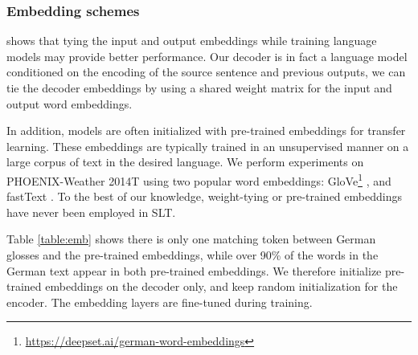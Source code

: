 \documentclass[11pt]{article}
\begin{document}
\subsubsection*{Embedding schemes}

 shows that tying the input and output embeddings while training language models may provide better performance. Our decoder is in fact a language model conditioned on the encoding of the source sentence and previous outputs, we can tie the decoder embeddings by using a shared weight matrix for the input and output word embeddings.  

In addition, models are often initialized with pre-trained embeddings for transfer learning. These embeddings are typically trained in an unsupervised manner on a large corpus of text in the desired language. We perform experiments on PHOENIX-Weather 2014T using two popular word embeddings: GloVe\footnote{\url{https://deepset.ai/german-word-embeddings}} \cite{glove}, and fastText \cite{fasttext}. To the best of our knowledge, weight-tying or pre-trained embeddings have never been employed in SLT.

\begin{center}
\label{table:emb}
\end{center}




Table \ref{table:emb} shows there is only one matching token between German glosses and the pre-trained embeddings, while over 90\% of the words in the German text appear in both pre-trained embeddings. We therefore initialize pre-trained embeddings on the decoder only, and keep random initialization for the encoder. The embedding layers are fine-tuned during training.
\end{document}
